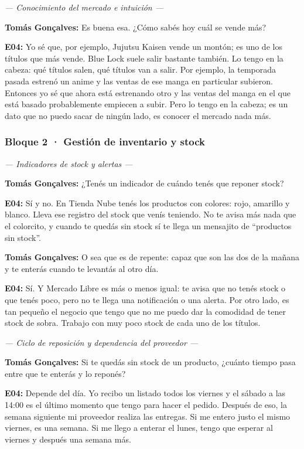 \noindent\textit{--- Conocimiento del mercado e intuición ---}

\noindent\textbf{Tomás Gonçalves:} Es buena esa. ¿Cómo sabés hoy cuál se vende más?

\noindent\textbf{E04:} Yo sé que, por ejemplo, Jujutsu Kaisen vende un montón; es uno de los títulos que más vende. Blue Lock suele salir bastante también. Lo tengo en la cabeza: qué títulos salen, qué títulos van a salir. Por ejemplo, la temporada pasada estrenó un anime y las ventas de ese manga en particular subieron. Entonces yo sé que ahora está estrenando otro y las ventas del manga en el que está basado probablemente empiecen a subir. Pero lo tengo en la cabeza; es un dato que no puedo sacar de ningún lado, es conocer el mercado nada más.

\subsubsection*{Bloque 2 · Gestión de inventario y stock}

\noindent\textit{--- Indicadores de stock y alertas ---}

\noindent\textbf{Tomás Gonçalves:} ¿Tenés un indicador de cuándo tenés que reponer stock?

\noindent\textbf{E04:} Sí y no. En Tienda Nube tenés los productos con colores: rojo, amarillo y blanco. Lleva ese registro del stock que venís teniendo. No te avisa más nada que el colorcito, y cuando te quedás sin stock sí te llega un mensajito de ``productos sin stock''.

\noindent\textbf{Tomás Gonçalves:} O sea que es de repente: capaz que son las dos de la mañana y te enterás cuando te levantás al otro día.

\noindent\textbf{E04:} Sí. Y Mercado Libre es más o menos igual: te avisa que no tenés stock o que tenés poco, pero no te llega una notificación o una alerta. Por otro lado, es tan pequeño el negocio que tengo que no me puedo dar la comodidad de tener stock de sobra. Trabajo con muy poco stock de cada uno de los títulos.

\noindent\textit{--- Ciclo de reposición y dependencia del proveedor ---}

\noindent\textbf{Tomás Gonçalves:} Si te quedás sin stock de un producto, ¿cuánto tiempo pasa entre que te enterás y lo reponés?

\noindent\textbf{E04:} Depende del día. Yo recibo un listado todos los viernes y el sábado a las 14:00 es el último momento que tengo para hacer el pedido. Después de eso, la semana siguiente mi proveedor realiza las entregas. Si me entero justo el mismo viernes, es una semana. Si me llego a enterar el lunes, tengo que esperar al viernes y después una semana más.


